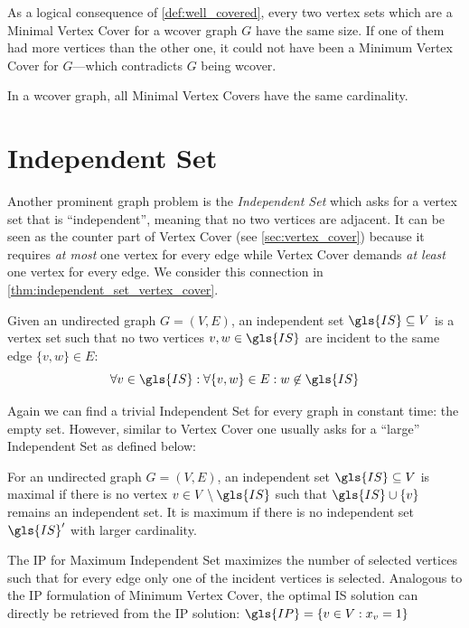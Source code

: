 As a logical consequence of \cref{def:well_covered}, every two vertex 
sets which are a Minimal Vertex Cover for a \gls{wcover} graph \(G\)
have the same size. If one of them had more vertices than the other
one, it could not have been a Minimum Vertex Cover for \(G\)---which
contradicts \(G\) being \gls{wcover}.

\begin{theorem}
  \label{thm:well_covered_vertex_cover}
  In a \gls{wcover} graph, all Minimal Vertex Covers have the same
  cardinality. \cite{graph_well_covered}
\end{theorem}

\section{Independent Set}
Another prominent graph problem is the \emph{Independent Set} which
asks for a vertex set that is ``independent'', meaning that no two
vertices are adjacent. It can be seen as the counter part of Vertex
Cover (see \cref{sec:vertex_cover}) because it requires \emph{at most}
one vertex for every edge while Vertex Cover demands \emph{at least}
one vertex for every edge. We consider this connection in 
\cref{thm:independent_set_vertex_cover}.

\begin{definition}
  \label{def:independent_set}
  Given an undirected graph \(G=(V,E)\), an independent set
  \(\gls{IS} \subseteq V\) is a vertex set such that no two
  vertices \(v,w \in \gls{IS}\) are incident to the same edge 
  \(\{v,w\} \in E\):
  \[
    \forall v \in \gls{IS}:
    \forall \{v,w\} \in E:
    w \not\in \gls{IS}
  \]
\end{definition}

Again we can find a trivial Independent Set for every graph in
constant time: the empty set. However, similar to Vertex Cover one 
usually asks for a ``large'' Independent Set as defined below:

\begin{definition}
  \label{def:max_independent_set}
  For an undirected graph \(G=(V,E)\), an independent set
  \(\gls{IS}\subseteq V\) is maximal if there is no vertex
  \(v \in V\setminus \gls{IS}\) such that
  \(\gls{IS} \cup \{v\}\) remains an independent set. It is
  maximum if there is no independent set \(\gls{IS}'\) with
  larger cardinality.
\end{definition}

The \gls{IP} for Maximum Independent Set maximizes the number of 
selected vertices such that for every edge only one of the incident 
vertices is selected. Analogous to the \gls{IP} formulation of Minimum
Vertex Cover, the optimal \gls{IS} solution can directly be retrieved 
from the \gls{IP} solution:
\( \gls{IP} = \{v \in V : x_v = 1\} \)


